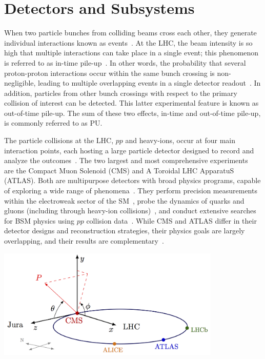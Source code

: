 \section{Detectors and Subsystems}\label{sec:detectors}

When two particle bunches from colliding beams cross each other, they generate individual interactions known as events~\cite{CMS:2008xjf,ATLAS:2008xda}. At the LHC, the beam intensity is so high that multiple interactions can take place in a single event; this phenomenon is referred to as in-time pile-up~\cite{Apollinari2017_HLLHC,Bertolini:2014}. In other words, the probability that several proton-proton interactions occur within the same bunch crossing is non-negligible, leading to multiple overlapping events in a single detector readout~\cite{Cacciari:2011ma,Cacciari:2008gp}. In addition, particles from other bunch crossings with respect to the primary collision of interest can be detected. This latter experimental feature is known as out-of-time pile-up. The sum of these two effects, in-time and out-of-time pile-up, is commonly referred to as PU. 


The particle collisions at the LHC, $pp$ and heavy-ions,  occur at four main interaction points, each hosting a large particle detector designed to record and analyze the outcomes~\cite{CMS:2008xjf,ATLAS:2008xda}. The two largest and most comprehensive experiments~\cite{CMS:2008xjf,ATLAS:2008xda} are  the Compact Muon Solenoid (CMS) and A Toroidal LHC ApparatuS (ATLAS). Both are multipurpose detectors with broad physics programs, capable of exploring a wide range of phenomena~\cite{CMS:2008xjf,ATLAS:2008xda}. They perform precision measurements within the electroweak sector of the SM~\cite{1674-1137-40-10-100001}, probe the dynamics of quarks and gluons (including through heavy-ion collisions)~\cite{deFavereau:2013fsa}, and conduct extensive searches for BSM physics using $pp$ collision data~\cite{CMS:2012gu,ATLAS:2012yve}. While CMS and ATLAS differ in their detector designs and reconstruction strategies, their physics goals are largely overlapping, and their results are complementary~\cite{CMS:2008xjf,ATLAS:2008xda}.


\begin{center}
    \includegraphics[width=0.8\textwidth]{Images/coordinatechart.png}
    \label{fig_coordinates}
\end{center}

